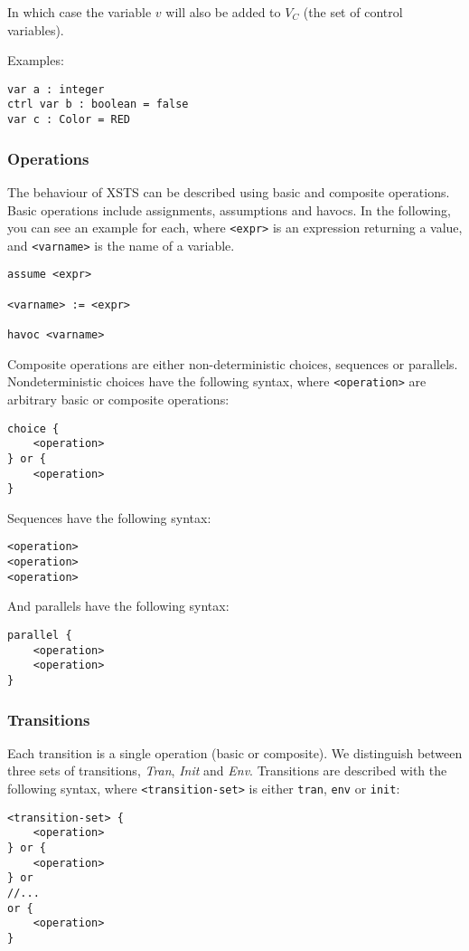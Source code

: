 In which case the variable \(v\) will also be added to \(V_C\) (the set of control variables).

Examples:

\begin{lstlisting}[language=xsts]
var a : integer
ctrl var b : boolean = false
var c : Color = RED
\end{lstlisting}

\subsubsection{Operations}

The behaviour of XSTS can be described using basic and composite operations. Basic operations include assignments, assumptions and havocs. In the following, you can see an example for each, where \verb*|<expr>| is an expression returning a value, and \verb*|<varname>| is the name of a variable.

\begin{lstlisting}[language=xsts]
assume <expr>

<varname> := <expr>

havoc <varname>
\end{lstlisting}

Composite operations are either non-deterministic choices, sequences or parallels. Nondeterministic choices have the following syntax, where \verb|<operation>| are arbitrary basic or composite operations:


\begin{lstlisting}[language=xsts]
choice { 
	<operation>
} or { 
	<operation>
}
\end{lstlisting}

Sequences have the following syntax:

\begin{lstlisting}[language=xsts]
<operation>
<operation>
<operation>
\end{lstlisting}

And parallels have the following syntax:

\begin{lstlisting}[language=xsts]
parallel { 
	<operation>
	<operation>
}
\end{lstlisting}

\subsubsection{Transitions}

Each transition is a single operation (basic or composite). We distinguish between three
sets of transitions, \emph{Tran}, \emph{Init} and \emph{Env}. Transitions are described with the following syntax, where \verb|<transition-set>| is either \verb|tran|, \verb|env| or \verb|init|:

\begin{lstlisting}[language=xsts]
<transition-set> {
	<operation>
} or {
	<operation>
} or
//...
or {
	<operation>
}
\end{lstlisting}